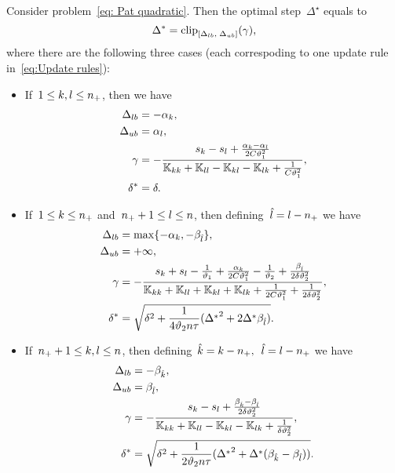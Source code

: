 \begin{theorem}\label{thm:Update rule PatMat with quadratic loss}
  Consider problem~\eqref{eq: Pat quadratic}. Then the optimal step~$\Delta^\star$ equals to
  \begin{equation}\label{eq:Delta_optimal2}
    \Delta^{*} = \clip{\Delta_{lb}}{\Delta_{ub}}{\gamma},
  \end{equation}
  where there are the following three cases (each correspoding to one update rule in~\eqref{eq:Update rules}):
  \begin{itemize}
    \item If~$1\le k, l \le n_{+}$, then we have
    \begin{align*}
      \Delta_{lb} & = -\alpha_k, \\
      \Delta_{ub} & = \alpha_l, \\
      \gamma      & = -\frac{s_k - s_l + \frac{\alpha_k - \alpha_l}{2C\vartheta_1^2}}{\mathbb{K}_{kk} + \mathbb{K}_{ll} - \mathbb{K}_{kl} - \mathbb{K}_{lk} + \frac{1}{C\vartheta_1^2}}, \\
      \delta^{*}  & = \delta.
    \end{align*}
    \item If~$1 \le k \le n_{+}$ and~$n_{+} + 1 \le l \le n$, then defining~$\hat{l} = l - n_{+}$ we have
    \begin{align*}
      \Delta_{lb} & = \max\{- \alpha_k, - \beta_{\hat{l}}\}, \\
      \Delta_{ub} & = +\infty, \\
      \gamma      & = -\frac{s_k + s_l  - \frac{1}{\vartheta_1} + \frac{\alpha_k}{2C\vartheta_1^2} - \frac{1}{\vartheta_2} + \frac{\beta_{\hat{l}}}{2\delta\vartheta_2^2}}{\mathbb{K}_{kk} + \mathbb{K}_{ll} + \mathbb{K}_{kl} + \mathbb{K}_{lk} + \frac{1}{2C\vartheta_1^2} + \frac{1}{2\delta\vartheta_2^2}}, \\
      \delta^{*}  & = \sqrt{\delta^2 + \frac{1}{4 \vartheta_2 n \tau}({\Delta^{*}}^2 + 2 \Delta^{*} \beta_{\hat{l}})}.
    \end{align*}
    \item If~$n_{+} + 1\le k,l \le n$, then defining~$\hat{k} = k - n_{+},$~$\hat{l} = l - n_{+}$ we have
    \begin{align*}
      \Delta_{lb} & = - \beta_{\hat{k}}, \\
      \Delta_{ub} & = \beta_{\hat{l}}, \\
      \gamma      & = -\frac{s_k - s_l + \frac{\beta_{\hat{k}} - \beta_{\hat{l}}}{2\delta \vartheta_2^2}}{\mathbb{K}_{kk} + \mathbb{K}_{ll} - \mathbb{K}_{kl} - \mathbb{K}_{lk} + \frac{1}{\delta \vartheta_2^2}}, \\
      \delta^{*}  & = \sqrt{\delta^2 + \frac{1}{2 \vartheta_2 n \tau}({\Delta^{*}}^2 + \Delta^{*} (\beta_{\hat{k}} - \beta_{\hat{l}}))}.
    \end{align*}
  \end{itemize}
\end{theorem}

